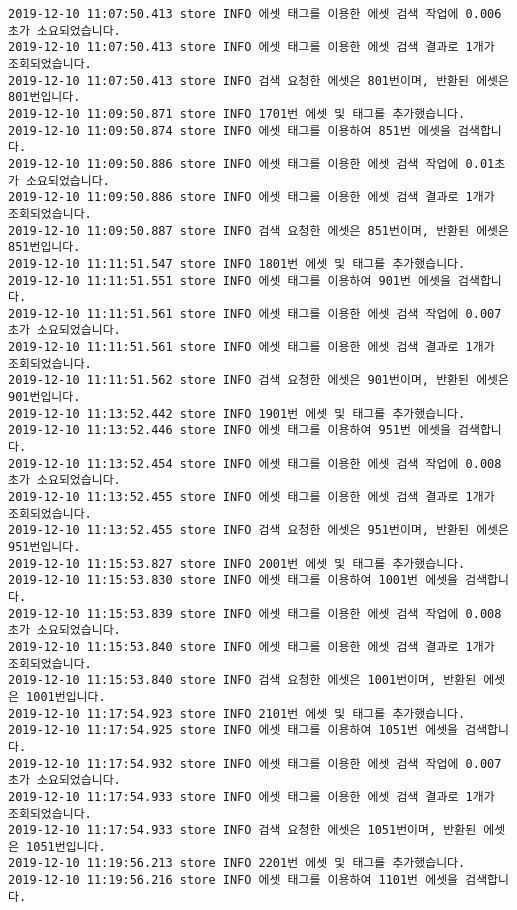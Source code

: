 \begin{Verbatim}[fontsize=\tiny, breaklines=true, breakanywhere=true]
2019-12-10 11:07:50.413 store INFO 에셋 태그를 이용한 에셋 검색 작업에 0.006초가 소요되었습니다.
2019-12-10 11:07:50.413 store INFO 에셋 태그를 이용한 에셋 검색 결과로 1개가 조회되었습니다.
2019-12-10 11:07:50.413 store INFO 검색 요청한 에셋은 801번이며, 반환된 에셋은 801번입니다.
2019-12-10 11:09:50.871 store INFO 1701번 에셋 및 태그를 추가했습니다.
2019-12-10 11:09:50.874 store INFO 에셋 태그를 이용하여 851번 에셋을 검색합니다.
2019-12-10 11:09:50.886 store INFO 에셋 태그를 이용한 에셋 검색 작업에 0.01초가 소요되었습니다.
2019-12-10 11:09:50.886 store INFO 에셋 태그를 이용한 에셋 검색 결과로 1개가 조회되었습니다.
2019-12-10 11:09:50.887 store INFO 검색 요청한 에셋은 851번이며, 반환된 에셋은 851번입니다.
2019-12-10 11:11:51.547 store INFO 1801번 에셋 및 태그를 추가했습니다.
2019-12-10 11:11:51.551 store INFO 에셋 태그를 이용하여 901번 에셋을 검색합니다.
2019-12-10 11:11:51.561 store INFO 에셋 태그를 이용한 에셋 검색 작업에 0.007초가 소요되었습니다.
2019-12-10 11:11:51.561 store INFO 에셋 태그를 이용한 에셋 검색 결과로 1개가 조회되었습니다.
2019-12-10 11:11:51.562 store INFO 검색 요청한 에셋은 901번이며, 반환된 에셋은 901번입니다.
2019-12-10 11:13:52.442 store INFO 1901번 에셋 및 태그를 추가했습니다.
2019-12-10 11:13:52.446 store INFO 에셋 태그를 이용하여 951번 에셋을 검색합니다.
2019-12-10 11:13:52.454 store INFO 에셋 태그를 이용한 에셋 검색 작업에 0.008초가 소요되었습니다.
2019-12-10 11:13:52.455 store INFO 에셋 태그를 이용한 에셋 검색 결과로 1개가 조회되었습니다.
2019-12-10 11:13:52.455 store INFO 검색 요청한 에셋은 951번이며, 반환된 에셋은 951번입니다.
2019-12-10 11:15:53.827 store INFO 2001번 에셋 및 태그를 추가했습니다.
2019-12-10 11:15:53.830 store INFO 에셋 태그를 이용하여 1001번 에셋을 검색합니다.
2019-12-10 11:15:53.839 store INFO 에셋 태그를 이용한 에셋 검색 작업에 0.008초가 소요되었습니다.
2019-12-10 11:15:53.840 store INFO 에셋 태그를 이용한 에셋 검색 결과로 1개가 조회되었습니다.
2019-12-10 11:15:53.840 store INFO 검색 요청한 에셋은 1001번이며, 반환된 에셋은 1001번입니다.
2019-12-10 11:17:54.923 store INFO 2101번 에셋 및 태그를 추가했습니다.
2019-12-10 11:17:54.925 store INFO 에셋 태그를 이용하여 1051번 에셋을 검색합니다.
2019-12-10 11:17:54.932 store INFO 에셋 태그를 이용한 에셋 검색 작업에 0.007초가 소요되었습니다.
2019-12-10 11:17:54.933 store INFO 에셋 태그를 이용한 에셋 검색 결과로 1개가 조회되었습니다.
2019-12-10 11:17:54.933 store INFO 검색 요청한 에셋은 1051번이며, 반환된 에셋은 1051번입니다.
2019-12-10 11:19:56.213 store INFO 2201번 에셋 및 태그를 추가했습니다.
2019-12-10 11:19:56.216 store INFO 에셋 태그를 이용하여 1101번 에셋을 검색합니다.

\end{Verbatim}
